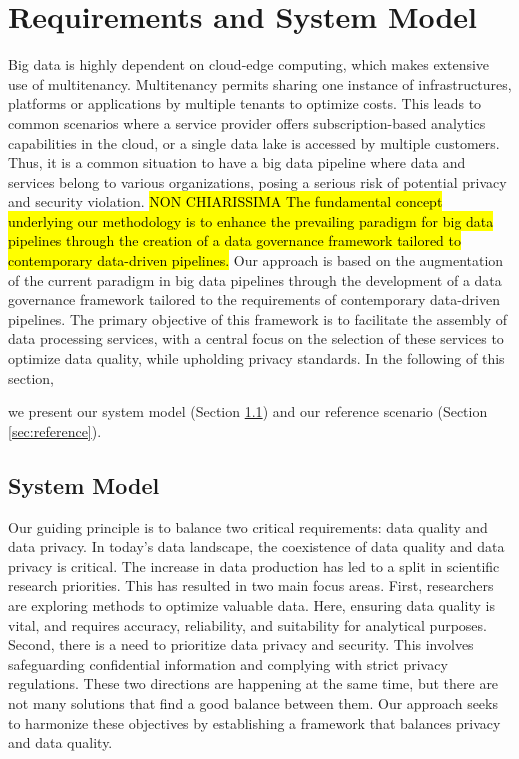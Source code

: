\section{Requirements and System Model}\label{sec:requirements}
Big data is highly dependent on cloud-edge computing, which makes extensive use of multitenancy.
Multitenancy permits sharing one instance of infrastructures, platforms or applications by multiple tenants to optimize costs. This leads to common scenarios where a service provider offers subscription-based analytics capabilities in the cloud, or a single data lake is accessed by multiple customers. Thus, it is a common situation to have a big data pipeline where data and services belong to various organizations, posing a serious risk of potential privacy and security violation.
\hl{NON CHIARISSIMA The fundamental concept underlying our methodology is to enhance the prevailing paradigm for big data pipelines through the creation of a data governance framework tailored to contemporary data-driven pipelines.}
Our approach is based on the augmentation of the current paradigm in big data pipelines through the development of a data governance framework tailored to the requirements of contemporary data-driven pipelines.
The primary objective of this framework is to facilitate the assembly of data processing services, with a central focus on the selection of these services to optimize data quality, while upholding privacy standards. In the following of this section,



we present our system model (Section \ref{sec:systemmodel}) and our reference scenario (Section \ref{sec:reference}).

\subsection{System Model}\label{sec:systemmodel}
Our guiding principle is to balance two critical requirements: data quality and data privacy. In today's data landscape, the coexistence of data quality and data privacy is critical. The increase in data production has led to a split in scientific research priorities. This has resulted in two main focus areas. First, researchers are exploring methods to optimize valuable data. Here, ensuring data quality is vital, and requires accuracy, reliability, and suitability for analytical purposes.
Second, there is a need to prioritize data privacy and security. This involves safeguarding confidential information and complying with strict privacy regulations. These two directions are happening at the same time, but there are not many solutions that find a good balance between them.
Our approach seeks to harmonize these objectives by establishing a framework that balances privacy and data quality.

